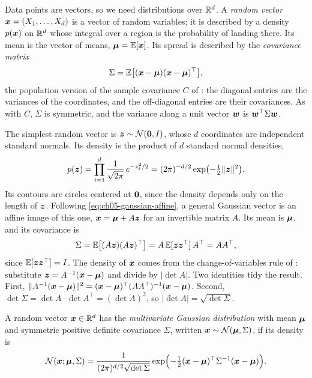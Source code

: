 Data points are vectors, so we need distributions over $\mathbb{R}^d$. A
\emph{random vector} $\bm{x} = (X_1, \dots, X_d)$ is a vector of random
variables; it is described by a density $p(\bm{x})$ on $\mathbb{R}^d$ whose
integral over a region is the probability of landing there. Its mean is
the vector of means, $\bm{\mu} = \mathbb{E}[\bm{x}]$. Its spread is
described by the \emph{covariance matrix}
\[
  \Sigma = \mathbb{E}\bigl[(\bm{x} - \bm{\mu})(\bm{x} - \bm{\mu})^\top\bigr],
\]
the population version of the sample covariance $C$ of
: the diagonal entries are the variances of
the coordinates, and the off-diagonal entries are their covariances. As
with $C$, $\Sigma$ is symmetric, and the variance along a unit vector
$\bm{w}$ is $\bm{w}^\top \Sigma \bm{w}$.

The simplest random vector is $\bm{z} \sim \mathcal{N}(\bm{0}, I)$,
whose $d$ coordinates are independent standard normals. Its density is
the product of $d$ standard normal densities,
\[
  p(\bm{z}) = \prod_{i=1}^d \frac{1}{\sqrt{2\pi}}\, e^{-z_i^2/2}
  = (2\pi)^{-d/2} \exp\bigl(-\tfrac12 \|\bm{z}\|^2\bigr) .
\]
Its contours are circles centered at $\bm{0}$, since the density
depends only on the length of $\bm{z}$. Following
\cref{eq:ch05-gaussian-affine}, a general Gaussian vector is an affine
image of this one, $\bm{x} = \bm{\mu} + A\bm{z}$ for an invertible
matrix $A$. Its mean is $\bm{\mu}$, and its covariance is
\[
  \Sigma = \mathbb{E}\bigl[(A\bm{z})(A\bm{z})^\top\bigr]
  = A\, \mathbb{E}[\bm{z}\bm{z}^\top]\, A^\top = AA^\top ,
\]
since $\mathbb{E}[\bm{z}\bm{z}^\top] = I$. The density of $\bm{x}$ comes from
the change-of-variables rule of : substitute
$\bm{z} = A^{-1}(\bm{x} - \bm{\mu})$ and divide by $|\det A|$. Two
identities tidy the result. First, $\|A^{-1}(\bm{x} - \bm{\mu})\|^2 =
(\bm{x} - \bm{\mu})^\top (AA^\top)^{-1} (\bm{x} - \bm{\mu})$.
Second, $\det \Sigma = \det A \cdot \det A^\top = (\det A)^2$, so
$|\det A| = \sqrt{\det \Sigma}$.

\begin{definition}
  \label{def:mvn}
  A random vector $\bm{x} \in \mathbb{R}^d$ has the \emph{multivariate
  Gaussian distribution} with mean $\bm{\mu}$ and symmetric positive
  definite covariance $\Sigma$, written $\bm{x} \sim
  \mathcal{N}(\bm{\mu}, \Sigma)$, if its density is
  \[
    \mathcal{N}(\bm{x}; \bm{\mu}, \Sigma)
    = \frac{1}{(2\pi)^{d/2} \sqrt{\det \Sigma}}
      \exp\Bigl(-\tfrac12 (\bm{x} - \bm{\mu})^\top \Sigma^{-1}
      (\bm{x} - \bm{\mu})\Bigr) .
  \]
\end{definition}

